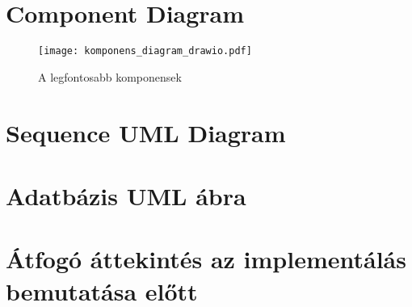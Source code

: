 

\section{Component Diagram}

\begin{figure}[hbt] 
	\centering
	\texttt{[image: komponens\_diagram\_drawio.pdf]}
	\caption{A legfontosabb komponensek}\label{fig:komponens_diagram}
\end{figure}

\section{Sequence UML Diagram}
\section{Adatbázis UML ábra}

\section{Átfogó áttekintés az implementálás bemutatása előtt}